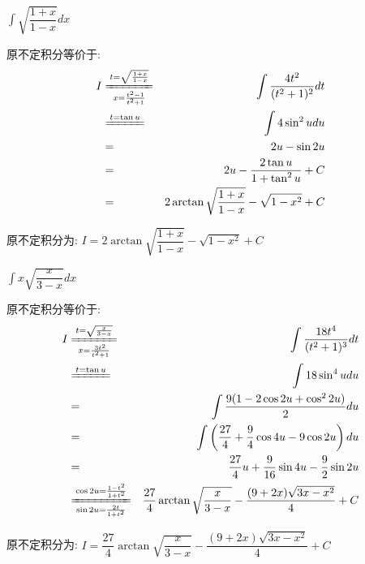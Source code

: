 \begin{proposition}
	$\int \sqrt{\dfrac{1+x}{1-x}}dx$
\end{proposition}
\begin{solution}
		
	原不定积分等价于:  
	\begin{eqnarray*}
		I&\xlongequal[x=\frac{t^2-1}{t^2+1}]{t=\sqrt{\frac{1+x}{1-x}}}&\int\dfrac{4t^2}{(t^2+1)^2}dt\\
		&\xlongequal{t=\tan u}&\int 4\sin^2 udu\\
		&=&2u-\sin2u\\
		&=&2u-\dfrac{2\tan u}{1+\tan^2 u}+C\\
		&=&2\arctan\sqrt{\dfrac{1+x}{1-x}}-\sqrt{1-x^2}+C
	\end{eqnarray*}
	
	原不定积分为:  $I=2\arctan\sqrt{\dfrac{1+x}{1-x}}-\sqrt{1-x^2}+C$
\end{solution}
\begin{proposition}
	$\int x\sqrt{\dfrac{x}{3-x}}dx$
\end{proposition}
\begin{solution}
		
	原不定积分等价于:  
	\begin{eqnarray*}
		I&\xlongequal[x=\frac{3t^2}{t^2+1}]{t=\sqrt{\frac{x}{3-x}}}&\int\dfrac{18t^4}{(t^2+1)^3}dt\\
		&\xlongequal{t=\tan u}&\int 18\sin^4 udu\\
		&=&\int \dfrac{9(1-2\cos 2u+\cos^22u)}{2}du\\
		&=&\int \left( \dfrac{27}{4}+\dfrac{9}{4}\cos 4u-9\cos 2u\right)du\\
		&=&\dfrac{27}{4}u+\dfrac{9}{16}\sin 4u-\dfrac{9}{2}\sin 2u\\
		&\xlongequal[\sin 2u=\frac{2t}{1+t^2}]{\cos 2u=\frac{1-t^2}{1+t^2}}& \dfrac{27}{4}\arctan\sqrt{\dfrac{x}{3-x}}-\dfrac{(9+2x)\sqrt{3x-x^2}}{4}+C
	\end{eqnarray*}
	
	原不定积分为:  $I=\dfrac{27}{4}\arctan\sqrt{\dfrac{x}{3-x}}-\dfrac{(9+2x)\sqrt{3x-x^2}}{4}+C$
\end{solution}

